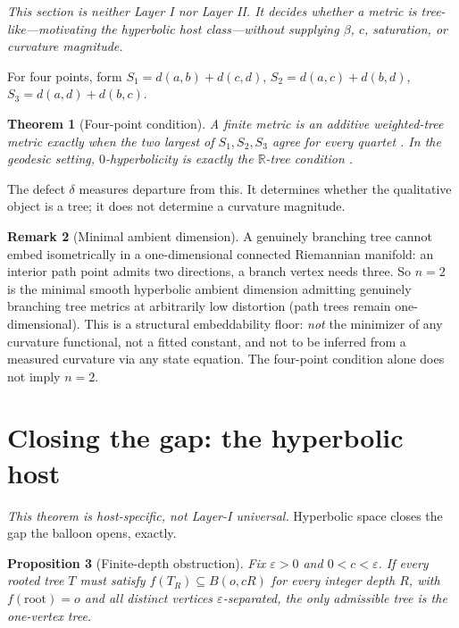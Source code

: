 \documentclass[11pt,reqno]{amsart}
\theoremstyle{plain}
\newtheorem{theorem}{Theorem}[section]
\newtheorem{proposition}[theorem]{Proposition}
\theoremstyle{definition}
\newtheorem{remark}[theorem]{Remark}
\newcommand{\eps}{\varepsilon}
\begin{document}
\emph{This section is neither Layer I nor Layer II. It decides whether a metric is tree-like---motivating the hyperbolic host class---without supplying $\beta$, $c$, saturation, or curvature magnitude.}

For four points, form $S_1=d(a,b)+d(c,d)$, $S_2=d(a,c)+d(b,d)$, $S_3=d(a,d)+d(b,c)$.

\begin{theorem}[Four-point condition]\label{thm:fourpoint}
A finite metric is an additive weighted-tree metric exactly when the two largest of $S_1,S_2,S_3$ agree for every quartet \cite{buneman1971}. In the geodesic setting, $0$-hyperbolicity is exactly the $\mathbb R$-tree condition \cite{gromov1987}.
\end{theorem}

The defect $\delta$ measures departure from this. It determines whether the qualitative object is a tree; it does not determine a curvature magnitude.

\begin{remark}[Minimal ambient dimension]\label{rem:floor}
A genuinely branching tree cannot embed isometrically in a one-dimensional connected Riemannian manifold: an interior path point admits two directions, a branch vertex needs three. So $n=2$ is the minimal smooth hyperbolic ambient dimension admitting genuinely branching tree metrics at arbitrarily low distortion (path trees remain one-dimensional). This is a structural embeddability floor: \emph{not} the minimizer of any curvature functional, not a fitted constant, and not to be inferred from a measured curvature via any state equation. The four-point condition alone does not imply $n=2$.
\end{remark}

\section{Closing the gap: the hyperbolic host}\label{sec:relational}

\emph{This theorem is host-specific, not Layer-I universal.} Hyperbolic space closes the gap the balloon opens, exactly.

\begin{proposition}[Finite-depth obstruction]\label{prop:finitedepth}
Fix $\eps>0$ and $0<c<\eps$. If every rooted tree $T$ must satisfy $f(T_R)\subseteq B(o,cR)$ for every integer depth $R$, with $f(\mathrm{root})=o$ and all distinct vertices $\eps$-separated, the only admissible tree is the one-vertex tree.
\end{proposition}
\end{document}
